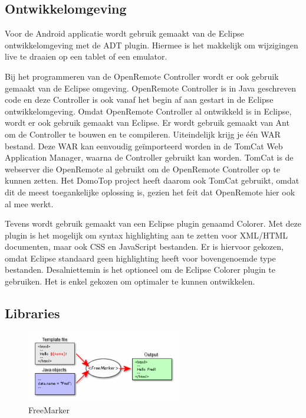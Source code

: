 \documentclass[]{article}
\begin{document}
\subsection{Ontwikkelomgeving}
Voor de Android applicatie wordt gebruik gemaakt van de Eclipse
ontwikkelomgeving met de ADT plugin. Hiermee is het makkelijk om wijzigingen
live te draaien op een tablet of een emulator.

Bij het programmeren van de OpenRemote Controller wordt er ook gebruik gemaakt
van de Eclipse omgeving. OpenRemote Controller is in Java geschreven code
en deze Controller is ook vanaf het begin af aan gestart in de Eclipse
ontwikkelomgeving. Omdat OpenRemote Controller al ontwikkeld is in
Eclipse, wordt er ook gebruik gemaakt van Eclipse. Er wordt gebruik gemaakt van Ant 
om de Controller te bouwen en te compileren. Uiteindelijk krijg
je \'e\'en WAR bestand. Deze WAR kan eenvoudig ge\"importeerd worden in de TomCat
Web Application Manager, waarna de Controller gebruikt kan worden. TomCat is
de webserver die OpenRemote al gebruikt om de OpenRemote Controller op te
kunnen zetten. Het DomoTop project heeft daarom ook TomCat gebruikt, omdat
dit de meest toegankelijke oplossing is, gezien het feit dat OpenRemote hier
ook al mee werkt.

Tevens wordt gebruik gemaakt van een Eclipse plugin genaamd Colorer.
Met deze plugin is het mogelijk om syntax highlighting aan te zetten voor
XML/HTML documenten, maar ook CSS en JavaScript bestanden. Er is hiervoor
gekozen, omdat Eclipse standaard geen highlighting heeft voor bovengenoemde
type bestanden. Desalniettemin is het optioneel om de Eclipse Colorer
plugin te gebruiken. Het is enkel gekozen om optimaler te kunnen ontwikkelen.

\subsection{Libraries}
\begin{figure}[htpb]
   \begin{center}
     \includegraphics[width=0.6\textwidth]{freemarker.pdf}
   \end{center}
   \caption{FreeMarker}
\end{figure}
\end{document}
